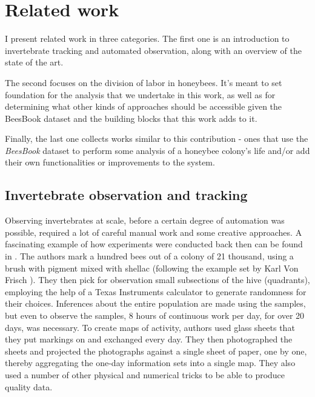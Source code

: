 
\chapter{Related work}  %

\ifpdf
    \graphicspath{{Chapters/Chapter2/Figs/Raster/}{Chapters/Chapter2/Figs/PDF/}{Chapters/Chapter2/Figs/}}
\else
    \graphicspath{{Chapters/Chapter2/Figs/Vector/}{Chapters/Chapter2/Figs/}}
\fi

I present related work in three categories. The first one is an introduction to
invertebrate tracking and automated observation, along with an overview of the
state of the art. 

The second focuses on the division of labor in honeybees. It’s meant to set
foundation for the analysis that we undertake in this work, as well as for
determining what other kinds of approaches should be accessible given the
BeesBook dataset and the building blocks that this work adds to it.

Finally, the last one collects works similar to this contribution - ones that
use the \textit{BeesBook} dataset to perform some analysis of a honeybee
colony’s life and/or add their own functionalities or improvements to the
system.


\section{Invertebrate observation and tracking} 

Observing invertebrates at scale, before a certain degree of automation was
possible, required a lot of careful manual work and some creative approaches. A
fascinating example of how experiments were conducted back then can be found in
\citep{seeley_adaptive_1982}. The authors mark a hundred bees out of a colony of
21 thousand, using a brush with pigment mixed with shellac (following the
example set by Karl Von Frisch \citep{von_frisch_tanzsprache_1965}). They then
pick for observation small subsections of the hive (quadrants), employing the
help of a Texas Instruments calculator to generate randomness for their choices.
Inferences about the entire population are made using the samples, but even to
observe the samples, 8 hours of continuous work per day, for over 20 days, was
necessary. To create maps of activity, authors used glass sheets that they put
markings on and exchanged every day. They then photographed the sheets and
projected the photographs against a single sheet of paper, one by one, thereby
aggregating the one-day information sets into a single map. They also used a
number of other physical and numerical tricks to be able to produce quality
data. 

